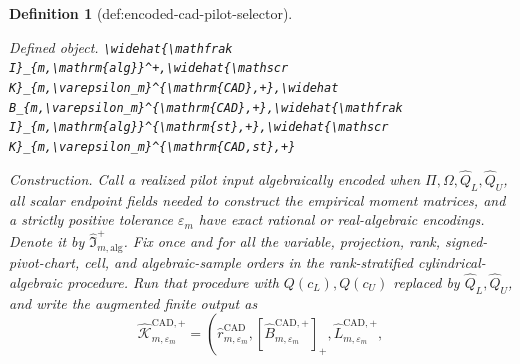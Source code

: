 \documentclass{article}
\newtheorem{definition}{Definition}
\begin{document}
\begin{definition}[def:encoded-cad-pilot-selector]\label{def:encoded-cad-pilot-selector}
\par\smallskip\noindent\emph{Defined object.} \texttt{\textbackslash{}\allowbreak{}widehat\{\textbackslash{}\allowbreak{}mathfrak I\}\allowbreak{}\_\allowbreak{}\{m,\allowbreak{}\textbackslash{}\allowbreak{}mathrm\{alg\}\allowbreak{}\}\allowbreak{}\textasciicircum{}+\allowbreak{},\allowbreak{}\textbackslash{}\allowbreak{}widehat\{\textbackslash{}\allowbreak{}mathscr K\}\allowbreak{}\_\allowbreak{}\{m,\allowbreak{}\textbackslash{}\allowbreak{}varepsilon\_\allowbreak{}m\}\allowbreak{}\textasciicircum{}\{\textbackslash{}\allowbreak{}mathrm\{CAD\}\allowbreak{},\allowbreak{}+\allowbreak{}\}\allowbreak{},\allowbreak{}\textbackslash{}\allowbreak{}widehat B\_\allowbreak{}\{m,\allowbreak{}\textbackslash{}\allowbreak{}varepsilon\_\allowbreak{}m\}\allowbreak{}\textasciicircum{}\{\textbackslash{}\allowbreak{}mathrm\{CAD\}\allowbreak{},\allowbreak{}+\allowbreak{}\}\allowbreak{},\allowbreak{}\textbackslash{}\allowbreak{}widehat\{\textbackslash{}\allowbreak{}mathfrak I\}\allowbreak{}\_\allowbreak{}\{m,\allowbreak{}\textbackslash{}\allowbreak{}mathrm\{alg\}\allowbreak{}\}\allowbreak{}\textasciicircum{}\{\textbackslash{}\allowbreak{}mathrm\{st\}\allowbreak{},\allowbreak{}+\allowbreak{}\}\allowbreak{},\allowbreak{}\textbackslash{}\allowbreak{}widehat\{\textbackslash{}\allowbreak{}mathscr K\}\allowbreak{}\_\allowbreak{}\{m,\allowbreak{}\textbackslash{}\allowbreak{}varepsilon\_\allowbreak{}m\}\allowbreak{}\textasciicircum{}\{\textbackslash{}\allowbreak{}mathrm\{CAD,\allowbreak{}st\}\allowbreak{},\allowbreak{}+\allowbreak{}\}\allowbreak{}}
\par\smallskip\noindent\emph{Construction.} Call a realized pilot input algebraically encoded when \(\Pi,\Omega,\widehat Q_L,\widehat Q_U\), all scalar endpoint fields needed to construct the empirical moment matrices, and a strictly positive tolerance \(\varepsilon_m\) have exact rational or real-algebraic encodings.  Denote it by \(\widehat{\mathfrak I}_{m,\mathrm{alg}}^+\).  Fix once and for all the variable, projection, rank, signed-pivot-chart, cell, and algebraic-sample orders in the rank-stratified cylindrical-algebraic procedure.  Run that procedure with \(Q(c_L),Q(c_U)\) replaced by \(\widehat Q_L,\widehat Q_U\), and write the augmented finite output as
\[
\widehat{\mathscr K}_{m,\varepsilon_m}^{\mathrm{CAD},+}
=\left(
\widehat r_{m,\varepsilon_m}^{\mathrm{CAD}},
[\widehat B_{m,\varepsilon_m}^{\mathrm{CAD},+}]_+,
\widehat L_{m,\varepsilon_m}^{\mathrm{CAD},+},
\]
\end{definition}
\end{document}

